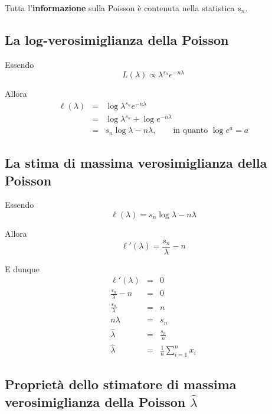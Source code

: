 \documentclass[
  11pt,
]{book}
\theoremstyle{mytheoremstyle}
\theoremstyle{mydefstyle}
\begin{document}
Tutta l'\textbf{informazione} sulla Poisson è contenuta nella statistica \(s_n\).

\subsection{La log-verosimiglianza della Poisson}\label{la-log-verosimiglianza-della-poisson}

Essendo
\[L(\lambda)\propto \lambda^{s_n} e^{-n\lambda}\]

Allora
\begin{eqnarray*}
          \ell(\lambda)   &=& \log \lambda^{s_n} e^{-n\lambda} \\
                          &=& \log \lambda^{s_n} + \log e^{-n\lambda} \\
                          &=& s_n\log\lambda - n\lambda,\qquad \text{in quanto } \log e^a = a
\end{eqnarray*}

\subsection{La stima di massima verosimiglianza della Poisson}\label{la-stima-di-massima-verosimiglianza-della-poisson}

Essendo
\[\ell(\lambda)=s_n\log\lambda - n\lambda\]

Allora
\[
          \ell'(\lambda) = \frac {s_n}\lambda-n
\]

E dunque
\begin{eqnarray*}
  \ell'(\lambda)            &=& 0\\
  \frac {s_n}\lambda-n      &=& 0\\
  \frac {s_n}\lambda        &=& n\\
  n\lambda                  &=& s_n\\
  \hat\lambda               &=& \frac{s_n}n\\
  \hat\lambda               &=& \frac{1}n\sum_{i=1}^n x_i
\end{eqnarray*}

\subsection{\texorpdfstring{Proprietà dello stimatore di massima verosimiglianza della Poisson \(\hat\lambda\)}{Proprietà dello stimatore di massima verosimiglianza della Poisson \textbackslash hat\textbackslash lambda}}\label{proprietuxe0-dello-stimatore-di-massima-verosimiglianza-della-poisson-hatlambda}
\end{document}
